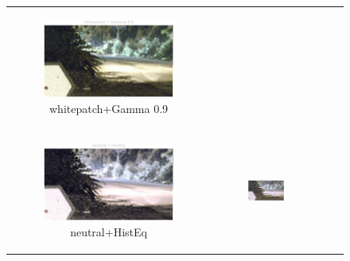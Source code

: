\documentclass[11pt, a4]{article}
\begin{document}
\begin{enumerate}
\begin{figure}[H]
{\begin{tabular}{cccc}
\begin{subfigure}[h]{0.45\linewidth}
							\includegraphics[width=\linewidth]{../output/RawImage3_Tone_whitepatch_Gamma0.9.pdf}
							\caption{whitepatch+Gamma 0.9}
							\label{fig:RawImage3_tone_8}
						\end{subfigure}\\
						\begin{subfigure}[h]{0.45\linewidth}
							\centering
							\includegraphics[width=\linewidth]{../output/RawImage3_Tone_neutral_HistEq.pdf}
							\caption{neutral+HistEq}
							\label{fig:RawImage3_tone_9}
						\end{subfigure} &
						\begin{subfigure}[h]{0.45\linewidth}
							\centering
							\includegraphics[width=\linewidth]{../output/RawImage3_Tone_neutral_Gamma0.5.pdf}

\end{subfigure}
\end{tabular}}
\end{figure}
\end{enumerate}
\end{document}
